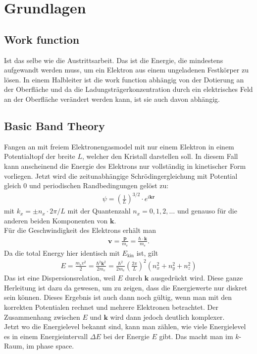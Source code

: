 \documentclass[paper=a4,10pt]{scrartcl}
\begin{document}
\section{Grundlagen}

\subsection{Work function}
Ist das selbe wie die Austrittsarbeit. Das ist die Energie, die mindestens aufgewandt werden muss, um ein Elektron aus einem ungeladenen Festkörper zu lösen.
In einem Halbleiter ist die work function abhängig von der Dotierung an der Oberfläche und da die Ladungsträgerkonzentration durch ein elektrisches Feld an der Oberfläche verändert werden kann, ist sie auch davon abhängig.

\subsection{Basic Band Theory}
Fangen an mit freiem Elektronengasmodel mit nur einem Elektron in einem Potentialtopf der breite $L$, welcher den Kristall darstellen soll. In diesem Fall kann anscheinend die Energie des Elektrons nur vollständig in kinetischer Form vorliegen. Jetzt wird die zeitunabhängige Schrödingergleichung  mit Potential gleich 0 und periodischen Randbedingungen gelöst zu:
\begin{align}
\psi = \left( \frac{1}{L}	\right)^{3/2} \cdot e^{i  \bm k \bm r}
\end{align}
mit $k_x = \pm n_x \cdot 2\pi / L$ mit der Quantenzahl $n_x=0,1,2,\dots$ und genauso für die anderen beiden Komponenten von $\bm k$.\\
Für die Geschwindigkeit des Elektrons erhält man 
\begin{align}
\bm v = \frac{\bm p}{m_e} = \frac{\hbar \cdot \bm k}{m_e}.
\end{align}
Da die total Energy hier identisch mit $E_{\text{kin}}$ ist, gilt
\begin{align}
E = \frac{m_e v^2}{2} = \frac{\hbar^2 \bm k^2}{2m_e} = \frac{\hbar^2}{2m_e} \left( \frac{2\pi}{L} \right)^2 (n_x^2 +n_y^2 + n_z^2)
\end{align}
Das ist eine Dispersionsrelation, weil $E$ durch $\bm k$ ausgedrückt wird.
Diese ganze Herleitung ist dazu da gewesen, um zu zeigen, dass die Energiewerte nur diskret sein können. Dieses Ergebnis ist auch dann noch gültig, wenn man mit den korrekten Potentialen rechnet und mehrere Elektronen betrachtet. Der Zusammenhang zwischen $E$ und $\bm k$ wird dann jedoch deutlich komplexer.\\
Jetzt wo die Energielevel bekannt sind, kann man zählen, wie viele Energielevel es in einem Energieintervall $\Delta E$ bei der Energie $E$ gibt. Das macht man im $k$-Raum, im phase space.
\end{document}
